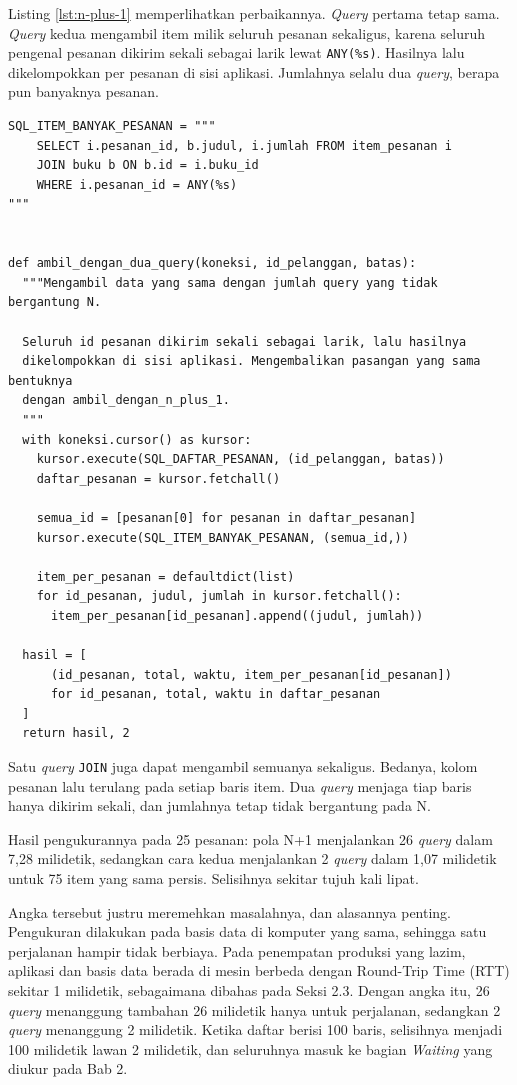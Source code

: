 Listing \ref{lst:n-plus-1} memperlihatkan perbaikannya. \textit{Query} pertama tetap
sama. \textit{Query} kedua mengambil item milik seluruh pesanan sekaligus, karena
seluruh pengenal pesanan dikirim sekali sebagai larik lewat
\texttt{ANY(\%s)}. Hasilnya lalu dikelompokkan per pesanan di sisi aplikasi.
Jumlahnya selalu dua \textit{query}, berapa pun banyaknya pesanan.

\begin{lstlisting}[style=PythonStyle, caption={Menghilangkan N+1 dengan dua query, berapa pun jumlah pesanannya, tersedia di \berkas{sources/chapter03/n-plus-1.py}}, label={lst:n-plus-1}]
SQL_ITEM_BANYAK_PESANAN = """
    SELECT i.pesanan_id, b.judul, i.jumlah FROM item_pesanan i
    JOIN buku b ON b.id = i.buku_id
    WHERE i.pesanan_id = ANY(%s)
"""


def ambil_dengan_dua_query(koneksi, id_pelanggan, batas):
  """Mengambil data yang sama dengan jumlah query yang tidak bergantung N.

  Seluruh id pesanan dikirim sekali sebagai larik, lalu hasilnya
  dikelompokkan di sisi aplikasi. Mengembalikan pasangan yang sama bentuknya
  dengan ambil_dengan_n_plus_1.
  """
  with koneksi.cursor() as kursor:
    kursor.execute(SQL_DAFTAR_PESANAN, (id_pelanggan, batas))
    daftar_pesanan = kursor.fetchall()

    semua_id = [pesanan[0] for pesanan in daftar_pesanan]
    kursor.execute(SQL_ITEM_BANYAK_PESANAN, (semua_id,))

    item_per_pesanan = defaultdict(list)
    for id_pesanan, judul, jumlah in kursor.fetchall():
      item_per_pesanan[id_pesanan].append((judul, jumlah))

  hasil = [
      (id_pesanan, total, waktu, item_per_pesanan[id_pesanan])
      for id_pesanan, total, waktu in daftar_pesanan
  ]
  return hasil, 2
\end{lstlisting}

Satu \textit{query} \texttt{JOIN} juga dapat mengambil semuanya sekaligus. Bedanya,
kolom pesanan lalu terulang pada setiap baris item. Dua \textit{query} menjaga tiap
baris hanya dikirim sekali, dan jumlahnya tetap tidak bergantung pada N.

Hasil pengukurannya pada 25 pesanan: pola N+1 menjalankan 26 \textit{query} dalam 7,28
milidetik, sedangkan cara kedua menjalankan 2 \textit{query} dalam 1,07 milidetik untuk
75 item yang sama persis. Selisihnya sekitar tujuh kali lipat.

Angka tersebut justru meremehkan masalahnya, dan alasannya penting. Pengukuran
dilakukan pada basis data di komputer yang sama, sehingga satu perjalanan
hampir tidak berbiaya. Pada penempatan produksi yang lazim, aplikasi dan basis
data berada di mesin berbeda dengan Round-Trip Time (RTT) sekitar 1 milidetik, sebagaimana
dibahas pada Seksi 2.3. Dengan angka itu, 26 \textit{query} menanggung tambahan 26
milidetik hanya untuk perjalanan, sedangkan 2 \textit{query} menanggung 2 milidetik.
Ketika daftar berisi 100 baris, selisihnya menjadi 100 milidetik lawan 2
milidetik, dan seluruhnya masuk ke bagian \emph{Waiting} yang diukur pada Bab 2.

